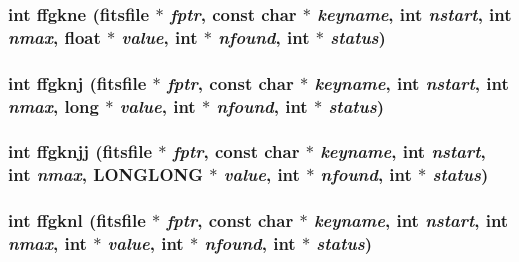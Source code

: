 \subsubsection{\setlength{\rightskip}{0pt plus 5cm}int ffgkne (\bf{fitsfile} $\ast$ {\em fptr}, const char $\ast$ {\em keyname}, int {\em nstart}, int {\em nmax}, float $\ast$ {\em value}, int $\ast$ {\em nfound}, int $\ast$ {\em status})}\label{test_2shm__client_2fitsio_8h_72336d055c54ad79acde9bbdf96cf8d7}


\subsubsection{\setlength{\rightskip}{0pt plus 5cm}int ffgknj (\bf{fitsfile} $\ast$ {\em fptr}, const char $\ast$ {\em keyname}, int {\em nstart}, int {\em nmax}, long $\ast$ {\em value}, int $\ast$ {\em nfound}, int $\ast$ {\em status})}\label{test_2shm__client_2fitsio_8h_7c692a01ca8d3c0f338cebea0bacfb2a}


\subsubsection{\setlength{\rightskip}{0pt plus 5cm}int ffgknjj (\bf{fitsfile} $\ast$ {\em fptr}, const char $\ast$ {\em keyname}, int {\em nstart}, int {\em nmax}, \bf{LONGLONG} $\ast$ {\em value}, int $\ast$ {\em nfound}, int $\ast$ {\em status})}\label{test_2shm__client_2fitsio_8h_ee677f0afd09400ba347a5fbab847265}


\subsubsection{\setlength{\rightskip}{0pt plus 5cm}int ffgknl (\bf{fitsfile} $\ast$ {\em fptr}, const char $\ast$ {\em keyname}, int {\em nstart}, int {\em nmax}, int $\ast$ {\em value}, int $\ast$ {\em nfound}, int $\ast$ {\em status})}\label{test_2shm__client_2fitsio_8h_8fe8509bc4d3ae7ff3befcf82289f7e0}


